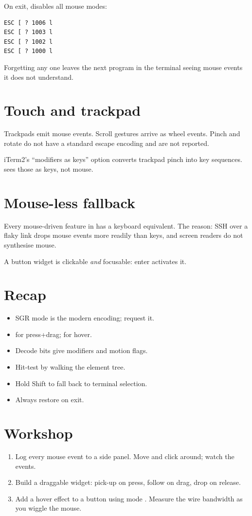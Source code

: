 On exit, \maya{} disables all mouse modes:

\begin{lstlisting}
ESC [ ? 1006 l
ESC [ ? 1003 l
ESC [ ? 1002 l
ESC [ ? 1000 l
\end{lstlisting}

Forgetting any one leaves the next program in the terminal
seeing mouse events it does not understand.

\section{Touch and trackpad}

Trackpads emit mouse events. Scroll gestures arrive as wheel
events. Pinch and rotate do not have a standard escape encoding
and are not reported.

iTerm2's ``modifiers as keys'' option converts trackpad pinch
into key sequences. \maya{} sees those as keys, not mouse.

\section{Mouse-less fallback}

Every mouse-driven feature in \maya{} has a keyboard
equivalent. The reason: SSH over a flaky link drops mouse
events more readily than keys, and screen readers do not
synthesise mouse.

A button widget is clickable \emph{and} focusable: enter
activates it.

\section{Recap}

\begin{recap}
\begin{itemize}[leftmargin=*]
  \item SGR mode is the modern encoding; request it.
  \item {} for press+drag;  for hover.
  \item Decode bits give modifiers and motion flags.
  \item Hit-test by walking the element tree.
  \item Hold Shift to fall back to terminal selection.
  \item Always restore on exit.
\end{itemize}
\end{recap}

\section*{Workshop}

\begin{enumerate}[leftmargin=*]
  \item Log every mouse event to a side panel. Move and
    click around; watch the events.
  \item Build a draggable widget: pick-up on press, follow
    on drag, drop on release.
  \item Add a hover effect to a button using mode
    . Measure the wire bandwidth as you wiggle
    the mouse.
\end{enumerate}
